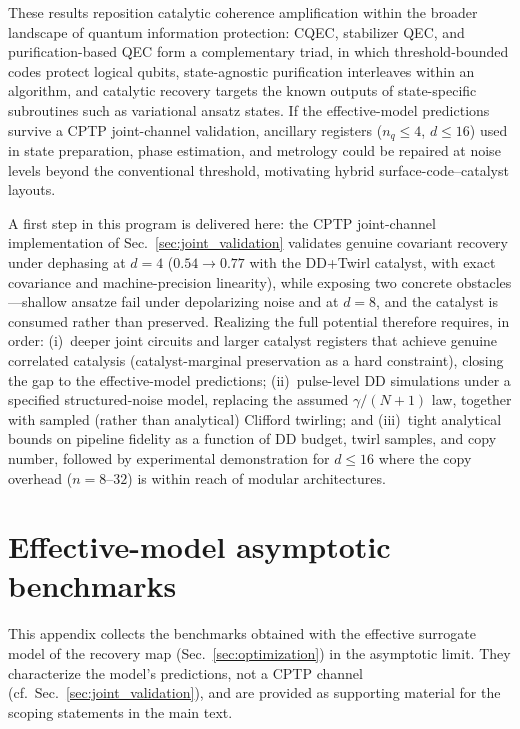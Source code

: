 \documentclass[pra,twocolumn,superscriptaddress,longbibliography,floatfix]{revtex4-2}
\begin{document}
These results reposition catalytic coherence amplification within the broader landscape of quantum information protection: CQEC, stabilizer QEC, and purification-based QEC form a complementary triad, in which threshold-bounded codes protect logical qubits, state-agnostic purification interleaves within an algorithm, and catalytic recovery targets the known outputs of state-specific subroutines such as variational ansatz states.
If the effective-model predictions survive a CPTP joint-channel validation, ancillary registers ($n_q \leq 4$, $d \leq 16$) used in state preparation, phase estimation, and metrology could be repaired at noise levels beyond the conventional threshold, motivating hybrid surface-code--catalyst layouts.

A first step in this program is delivered here: the CPTP joint-channel implementation of Sec.~\ref{sec:joint_validation} validates genuine covariant recovery under dephasing at $d = 4$ ($0.54 \to 0.77$ with the DD+Twirl catalyst, with exact covariance and machine-precision linearity), while exposing two concrete obstacles---shallow ansatze fail under depolarizing noise and at $d = 8$, and the catalyst is consumed rather than preserved.
Realizing the full potential therefore requires, in order: (i)~deeper joint circuits and larger catalyst registers that achieve genuine correlated catalysis (catalyst-marginal preservation as a hard constraint), closing the gap to the effective-model predictions; (ii)~pulse-level DD simulations under a specified structured-noise model, replacing the assumed $\gamma/(N+1)$ law, together with sampled (rather than analytical) Clifford twirling; and (iii)~tight analytical bounds on pipeline fidelity as a function of DD budget, twirl samples, and copy number, followed by experimental demonstration for $d \leq 16$ where the copy overhead ($n = 8$--$32$) is within reach of modular architectures.



\appendix

\section{Effective-model asymptotic benchmarks}
\label{app:effective_model}

This appendix collects the benchmarks obtained with the effective surrogate
model of the recovery map (Sec.~\ref{sec:optimization}) in the asymptotic
limit. They characterize the model's predictions, not a CPTP channel
(cf.\ Sec.~\ref{sec:joint_validation}), and are provided as supporting
material for the scoping statements in the main text.
\end{document}
